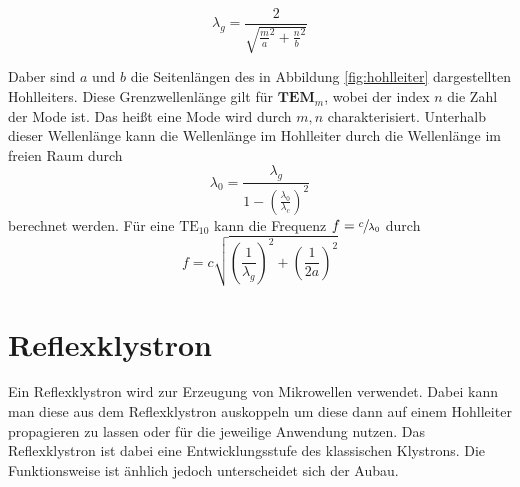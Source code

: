 \begin{equation}
              \label{eqn:lambda_g}
              \lambda_g = \frac{2}{\sqrt{\frac{m}{a}^2+\frac{n}{b}^2}}%
\end{equation}

Daber sind $a$ und $b$ die Seitenlängen des in Abbildung \ref{fig:hohlleiter} dargestellten Hohlleiters. Diese Grenzwellenlänge gilt für $\textbf{TEM}_m$, wobei der index $n$ die Zahl 
der Mode ist. Das heißt eine Mode wird durch $m,n$ charakterisiert. Unterhalb dieser Wellenlänge kann die Wellenlänge im Hohlleiter durch die Wellenlänge im freien Raum durch 
\begin{equation}
              \label{eqn:lambda_g}
              \lambda_0 = \frac{\lambda_g}{1-\left(\frac{\lambda_0}{\lambda_c}\right)^2}
\end{equation}
berechnet werden. 
Für eine $\mathrm{TE}_{10}$ kann die Frequenz $f = \sfrac{c}{\lambda_0}$ durch 
\begin{equation}
              \label{eqn:TE01}
              f = c\sqrt{\left(\frac{1}{\lambda_g}\right)^2+\left(\frac{1}{2a}\right)^2}
\end{equation}


\section{Reflexklystron}
\label{sec:reflexklystron}
Ein Reflexklystron wird zur Erzeugung von Mikrowellen verwendet. Dabei kann man diese aus dem Reflexklystron auskoppeln um diese dann auf einem Hohlleiter propagieren zu lassen oder 
für die jeweilige Anwendung nutzen. Das Reflexklystron ist dabei eine Entwicklungsstufe des klassischen Klystrons. Die Funktionsweise ist änhlich jedoch unterscheidet sich der Aubau.
